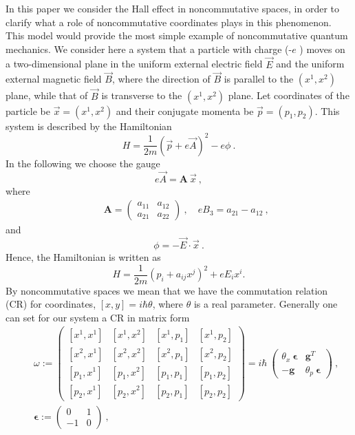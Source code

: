 \documentclass[a4paper,seceq]{ptptex}
\newcommand{\bfg}{ \boldsymbol{g} }
\newcommand{\bfA}{ \boldsymbol{A} }
\newcommand{\bfeps}{\boldsymbol{\epsilon}}
\newcommand{\vecp}{ {\vec p} }
\newcommand{\vecx}{ {\vec x} }
\newcommand{\vecA}{ {\vec A} }
\newcommand{\vecB}{ {\vec B} }
\newcommand{\vecE}{ {\vec E} }
\newcommand{\DEF}{:=}
\begin{document}
In this paper we consider the Hall effect in noncommutative spaces,
in order to clarify what a role of noncommutative coordinates plays
in this phenomenon.
This model would provide the most simple example of
noncommutative quantum mechanics.
We consider here a system that a particle with charge (-$e$ ) moves
on a two-dimensional plane in the uniform external electric field
$\vecE$ and the uniform external magnetic field $\vecB$,
where the direction of $\vecB$ is parallel to the $(x^1, x^2)$ plane,
while that of $\vecB$ is transverse to the $(x^1, x^2)$ plane.
Let coordinates of the particle be $\vecx = (x^1, x^2)$ and
their conjugate momenta be $\vecp = (p_1, p_2)$.
This system is described by the Hamiltonian
\begin{equation}
\label{101}
 H = \frac{1}{2m}( \vecp +e \vecA )^2 - e\phi~.
\end{equation}
In the following we choose the gauge
\begin{equation}
\label{102}
 e \vecA = \bfA~\vecx~,
\end{equation}
where
\begin{eqnarray}
 & & \bfA = \begin{pmatrix} 
                   a_{11} & a_{12} \\
                   a_{21} & a_{22}
            \end{pmatrix}~,
\quad 
 eB_3 = a_{21}-a_{12}~,
\label{103}
\end{eqnarray}
and
\begin{equation}
\label{104}
 \phi = -\vecE \cdot \vecx~.
\end{equation}
Hence, the Hamiltonian is written as
\begin{equation}
\label{105}
 H = \frac{1}{2m}\left(p_i+a_{ij}x^j\right)^2 + eE_{i}x^i.
\end{equation}
\indent
By noncommutative spaces we mean that we have the commutation relation
(CR) for coordinates, $\left[ x, y\right]=i\hbar \theta $,
where $\theta $ is a real parameter.
Generally one can set for our system a CR in matrix form
\cite{rf:4}
\begin{eqnarray}
 & & \omega \DEF
    \begin{pmatrix}
         [x^1,x^1] & [x^1,x^2] & [x^1,p_1] & [x^1,p_2] \\
         [x^2,x^1] & [x^2,x^2] & [x^2,p_1] & [x^2,p_2] \\
         [p_1,x^1] & [p_1,x^2] & [p_1,p_1] & [p_1,p_2] \\
         [p_2,x^1] & [p_2,x^2] & [p_2,p_1] & [p_2,p_2]
    \end{pmatrix}
   = i \hbar~\begin{pmatrix}
             \theta_x~\bfeps & \bfg^T \\
                      - \bfg & \theta_p~\bfeps \end{pmatrix}~,
\label{106} \\
 & & \bfeps := \begin{pmatrix}  0 & 1 \\ -1 & 0 \end{pmatrix}~,
\nonumber
\end{eqnarray}
\end{document}
